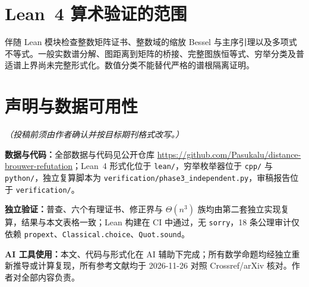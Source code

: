 \documentclass[11pt,a4paper]{article}
\theoremstyle{remark}
\begin{document}
\section{Lean~4 算术验证的范围}
伴随 Lean 模块检查整数矩阵证书、整数域的缩放 Bessel 与主序引理以及多项式不等式。一般实数谱分解、图距离到矩阵的桥接、完整图族恒等式、穷举分类及普适谱上界尚未完整形式化。数值分类不能替代严格的谱根隔离证明。

\section*{声明与数据可用性}
\emph{（投稿前须由作者确认并按目标期刊格式改写。）}

\noindent\textbf{数据与代码：}全部数据与代码见公开仓库 \url{https://github.com/Pasukalu/distance-brouwer-refutation}；Lean~4 形式化位于 \texttt{lean/}，穷举枚举器位于 \texttt{cpp/} 与 \texttt{python/}，独立复算脚本为 \texttt{verification/phase3\_independent.py}，审稿报告位于 \texttt{verification/}。

\noindent\textbf{独立验证：}普查、六个有理证书、修正界与 $\Theta(n^3)$ 族均由第二套独立实现复算，结果与本文表格一致；Lean 构建在 CI 中通过，无 \texttt{sorry}，18 条公理审计仅依赖 \texttt{propext}、\texttt{Classical.choice}、\texttt{Quot.sound}。

\noindent\textbf{AI 工具使用：}本文、代码与形式化在 AI 辅助下完成；所有数学命题均经独立重新推导或计算复现，所有参考文献均于 2026-11-26 对照 Crossref/arXiv 核对。作者对全部内容负责。
\end{document}
